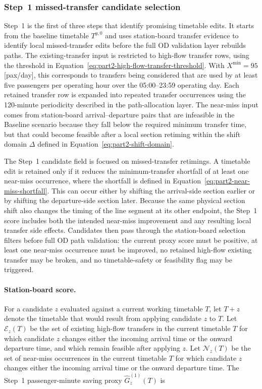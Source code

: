 \documentclass[preprint,12pt]{elsarticle}
\begin{document}
\subsubsection{Step~1 missed-transfer candidate selection}\label{sec:methods-part2-step1-selection}
Step~1 is the first of three steps that identify promising timetable edits. It starts from the baseline timetable \(T^{y,0}\) and uses station-board transfer evidence to identify local missed-transfer edits before the full OD validation layer rebuilds paths. The existing-transfer input is restricted to high-flow transfer rows, using the threshold in Equation~\eqref{eq:part2-high-flow-transfer-threshold}. With \(X^{\min}=95\) [pax/day], this corresponds to transfers being considered that are used by at least five passengers per operating hour over the 05:00--23:59 operating day. Each retained transfer row is expanded into repeated transfer occurrences using the 120-minute periodicity described in the path-allocation layer. The near-miss input comes from station-board arrival--departure pairs that are infeasible in the Baseline scenario because they fall below the required minimum transfer time, but that could become feasible after a local section retiming within the shift domain \(\Delta\) defined in Equation~\eqref{eq:part2-shift-domain}.

The Step~1 candidate field is focused on missed-transfer retimings. A timetable edit is retained only if it reduces the minimum-transfer shortfall of at least one near-miss occurrence, where the shortfall is defined in Equation~\eqref{eq:part2-near-miss-shortfall}. This can occur either by shifting the arrival-side section earlier or by shifting the departure-side section later. Because the same physical section shift also changes the timing of the line segment at its other endpoint, the Step~1 score includes both the intended near-miss improvement and any resulting local transfer side effects. Candidates then pass through the station-board selection filters before full OD path validation: the current proxy score must be positive, at least one near-miss occurrence must be improved, no retained high-flow existing transfer may be broken, and no timetable-safety or feasibility flag may be triggered.
\paragraph*{Station-board score.}
For a candidate \(z\) evaluated against a current working timetable \(T\), let \(T+z\) denote the timetable that would result from applying candidate \(z\) to \(T\). Let \(\mathcal{E}_z(T)\) be the set of existing high-flow transfers in the current timetable \(T\) for which candidate \(z\) changes either the incoming arrival time or the onward departure time, and which remain feasible after applying \(z\). Let \(\mathcal{N}_z(T)\) be the set of near-miss occurrences in the current timetable \(T\) for which candidate \(z\) changes either the incoming arrival time or the onward departure time. The Step~1 passenger-minute saving proxy \(\widehat G_z^{(1)}(T)\) is
\end{document}
